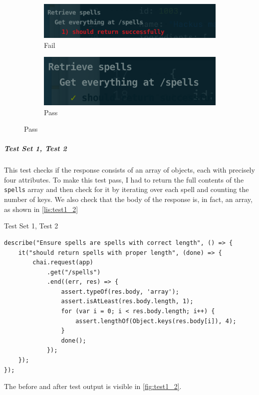 \begin{figure}[h]
\caption{Test output for test set 1, test 1}
\label{fig:test1_1}
	\centering
	\begin{subfigure}[b]{0.5\textwidth}
		\centering
		\includegraphics[width=\textwidth]{images/11_fail}
		\caption{Fail}
		\label{fig:test11_fail}
	\end{subfigure}
	\hfill
	\begin{subfigure}[b]{0.5\textwidth}
		\centering
		\includegraphics[width=\textwidth]{images/11_pass}
		\caption{Pass}
		\label{fig:test11_pass}
	\end{subfigure}
\end{figure}

\subparagraph{Test Set 1, Test 2} This test checks if the response consists of an array of objects, each with precisely four attributes. To make this test pass, I had to return the full contents of the \texttt{spells} array and then check for it by iterating over each spell and counting the number of keys. We also check that the body of the response is, in fact, an array, as shown in \autoref{lis:test1_2}

\begin{listing}[h]
\caption{Test Set 1, Test 2}
\label{lis:test1_2}
\begin{verbatim}
describe("Ensure spells are spells with correct length", () => {
	it("should return spells with proper length", (done) => {
		chai.request(app)
			.get("/spells")
			.end((err, res) => {
				assert.typeOf(res.body, 'array');
				assert.isAtLeast(res.body.length, 1);
				for (var i = 0; i < res.body.length; i++) {
					assert.lengthOf(Object.keys(res.body[i]), 4);
				}
				done();
			});
	});
});
\end{verbatim}
\end{listing}

The before and after test output is visible in \autoref{fig:test1_2}.

